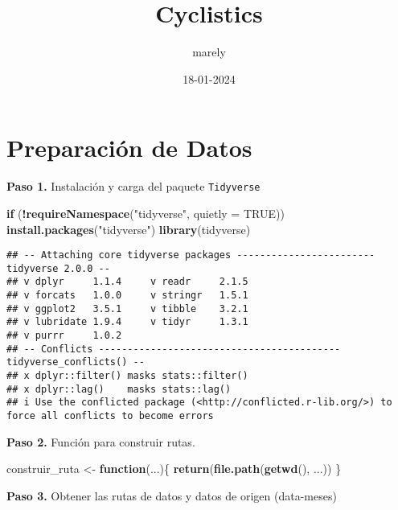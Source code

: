 \documentclass[
]{article}
\title{Cyclistics}
\author{marely}
\date{18-01-2024}
\newenvironment{Shaded}{\begin{snugshade}}{\end{snugshade}}
\newcommand{\AttributeTok}[1]{\textcolor[rgb]{0.13,0.29,0.53}{#1}}
\newcommand{\ConstantTok}[1]{\textcolor[rgb]{0.56,0.35,0.01}{#1}}
\newcommand{\ControlFlowTok}[1]{\textcolor[rgb]{0.13,0.29,0.53}{\textbf{#1}}}
\newcommand{\FunctionTok}[1]{\textcolor[rgb]{0.13,0.29,0.53}{\textbf{#1}}}
\newcommand{\NormalTok}[1]{#1}
\newcommand{\OtherTok}[1]{\textcolor[rgb]{0.56,0.35,0.01}{#1}}
\newcommand{\SpecialCharTok}[1]{\textcolor[rgb]{0.81,0.36,0.00}{\textbf{#1}}}
\newcommand{\StringTok}[1]{\textcolor[rgb]{0.31,0.60,0.02}{#1}}
\begin{document}
\maketitle

\section{Preparación de Datos}\label{preparaciuxf3n-de-datos}

\hfill\break
\textbf{Paso 1.} Instalación y carga del paquete \texttt{Tidyverse}

\begin{Shaded}
\begin{Highlighting}[]
\ControlFlowTok{if}\NormalTok{ (}\SpecialCharTok{!}\FunctionTok{requireNamespace}\NormalTok{(}\StringTok{"tidyverse"}\NormalTok{, }\AttributeTok{quietly =} \ConstantTok{TRUE}\NormalTok{)) }
  \FunctionTok{install.packages}\NormalTok{(}\StringTok{"tidyverse"}\NormalTok{) }
\FunctionTok{library}\NormalTok{(tidyverse) }
\end{Highlighting}
\end{Shaded}

\begin{verbatim}
## -- Attaching core tidyverse packages ------------------------ tidyverse 2.0.0 --
## v dplyr     1.1.4     v readr     2.1.5
## v forcats   1.0.0     v stringr   1.5.1
## v ggplot2   3.5.1     v tibble    3.2.1
## v lubridate 1.9.4     v tidyr     1.3.1
## v purrr     1.0.2     
## -- Conflicts ------------------------------------------ tidyverse_conflicts() --
## x dplyr::filter() masks stats::filter()
## x dplyr::lag()    masks stats::lag()
## i Use the conflicted package (<http://conflicted.r-lib.org/>) to force all conflicts to become errors
\end{verbatim}

\hfill\break
\textbf{Paso 2.} Función para construir rutas.

\begin{Shaded}
\begin{Highlighting}[]
\NormalTok{construir\_ruta }\OtherTok{\textless{}{-}} \ControlFlowTok{function}\NormalTok{(...)\{}
  \FunctionTok{return}\NormalTok{(}\FunctionTok{file.path}\NormalTok{(}\FunctionTok{getwd}\NormalTok{(), ...))}
\NormalTok{\} }
\end{Highlighting}
\end{Shaded}

\hfill\break
\textbf{Paso 3.} Obtener las rutas de datos y datos de origen
(data-meses)
\end{document}
